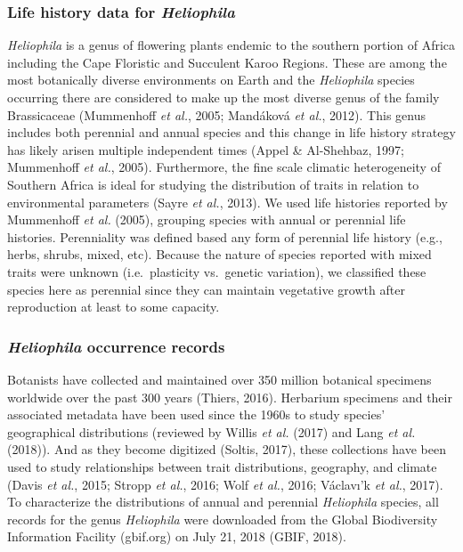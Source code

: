 \documentclass[man,floatsintext]{apa6}
\theoremstyle{definition}
\theoremstyle{definition}
\theoremstyle{definition}
\theoremstyle{remark}
\begin{document}
\hypertarget{life-history-data-for-heliophila}{%
\subsubsection{\texorpdfstring{Life history data for
\emph{Heliophila}}{Life history data for Heliophila}}\label{life-history-data-for-heliophila}}

\emph{Heliophila} is a genus of flowering plants endemic to the southern
portion of Africa including the Cape Floristic and Succulent Karoo
Regions. These are among the most botanically diverse environments on
Earth and the \emph{Heliophila} species occurring there are considered
to make up the most diverse genus of the family Brassicaceae (Mummenhoff
\emph{et al.}, 2005; Mandáková \emph{et al.}, 2012). This genus includes
both perennial and annual species and this change in life history
strategy has likely arisen multiple independent times (Appel \&
Al-Shehbaz, 1997; Mummenhoff \emph{et al.}, 2005). Furthermore, the fine
scale climatic heterogeneity of Southern Africa is ideal for studying
the distribution of traits in relation to environmental parameters
(Sayre \emph{et al.}, 2013). We used life histories reported by
Mummenhoff \emph{et al.} (2005), grouping species with annual or
perennial life histories. Perenniality was defined based any form of
perennial life history (e.g., herbs, shrubs, mixed, etc). Because the
nature of species reported with mixed traits were unknown
(i.e.~plasticity vs.~genetic variation), we classified these species
here as perennial since they can maintain vegetative growth after
reproduction at least to some capacity.

\hypertarget{heliophila-occurrence-records}{%
\subsubsection{\texorpdfstring{\emph{Heliophila} occurrence
records}{Heliophila occurrence records}}\label{heliophila-occurrence-records}}

Botanists have collected and maintained over 350 million botanical
specimens worldwide over the past 300 years (Thiers, 2016). Herbarium
specimens and their associated metadata have been used since the 1960s
to study species' geographical distributions (reviewed by Willis
\emph{et al.} (2017) and Lang \emph{et al.} (2018)). And as they become
digitized (Soltis, 2017), these collections have been used to study
relationships between trait distributions, geography, and climate (Davis
\emph{et al.}, 2015; Stropp \emph{et al.}, 2016; Wolf \emph{et al.},
2016; Václavı'k \emph{et al.}, 2017). To characterize the distributions
of annual and perennial \emph{Heliophila} species, all records for the
genus \emph{Heliophila} were downloaded from the Global Biodiversity
Information Facility (gbif.org) on July 21, 2018 (GBIF, 2018).
\end{document}
